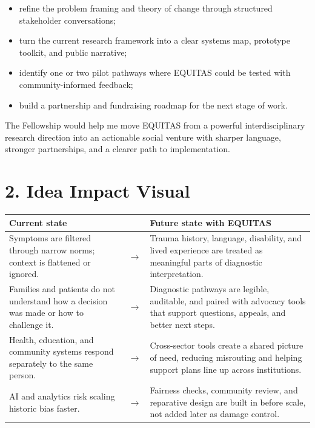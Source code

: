 \documentclass[11pt]{article}
\begin{document}
\begin{itemize}
\item refine the problem framing and theory of change through structured stakeholder conversations;
\item turn the current research framework into a clear systems map, prototype toolkit, and public narrative;
\item identify one or two pilot pathways where EQUITAS could be tested with community-informed feedback;
\item build a partnership and fundraising roadmap for the next stage of work.
\end{itemize}

The Fellowship would help me move EQUITAS from a powerful interdisciplinary research direction into an actionable social venture with sharper language, stronger partnerships, and a clearer path to implementation.

\section*{2. Idea Impact Visual}

\begin{center}
\renewcommand{\arraystretch}{1.4}
\begin{tabular}{|>{\raggedright\arraybackslash}p{}|>{\centering\arraybackslash}p{}|>{\raggedright\arraybackslash}p{}|}
\hline
\textbf{Current state} & & \textbf{Future state with EQUITAS} \\
\hline
Symptoms are filtered through narrow norms; context is flattened or ignored. & $\rightarrow$ & Trauma history, language, disability, and lived experience are treated as meaningful parts of diagnostic interpretation. \\
\hline
Families and patients do not understand how a decision was made or how to challenge it. & $\rightarrow$ & Diagnostic pathways are legible, auditable, and paired with advocacy tools that support questions, appeals, and better next steps. \\
\hline
Health, education, and community systems respond separately to the same person. & $\rightarrow$ & Cross-sector tools create a shared picture of need, reducing misrouting and helping support plans line up across institutions. \\
\hline
AI and analytics risk scaling historic bias faster. & $\rightarrow$ & Fairness checks, community review, and reparative design are built in before scale, not added later as damage control. \\
\hline
\end{tabular}
\end{center}
\end{document}
